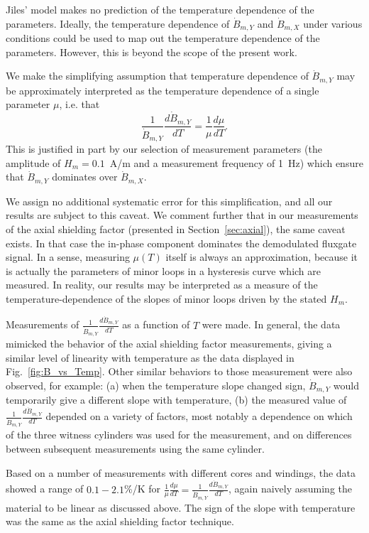 Jiles' model makes no prediction of the temperature dependence of the
parameters.  Ideally, the temperature dependence of $\dot{B}_{m,Y}$
and $\dot{B}_{m,X}$ under various conditions could be used to map out
the temperature dependence of the parameters.  However, this is beyond
the scope of the present work.

We make the simplifying assumption that temperature dependence of
$\dot{B}_{m,Y}$ may be approximately interpreted as the temperature
dependence of a single parameter $\mu$, i.e. that
\begin{equation}
\frac{1}{\dot{B}_{m,Y}}\frac{d\dot{B}_{m,Y}}{dT}=\frac{1}{\mu}\frac{d\mu}{dT}.
\end{equation}
This is justified in part by our selection of measurement parameters
(the amplitude of $H_m=0.1$~A/m and a measurement frequency of 1~Hz)
which ensure that $\dot{B}_{m,Y}$ dominates over $\dot{B}_{m,X}$.

We assign no additional systematic error for this simplification, and
all our results are subject to this caveat.  We comment further that
in our measurements of the axial shielding factor (presented in
Section~\ref{sec:axial}), the same caveat exists.  In that case the
in-phase component dominates the demodulated fluxgate signal.  In a
sense, measuring $\mu(T)$ itself is always an approximation, because
it is actually the parameters of minor loops in a hysteresis curve
which are measured.  In reality, our results may be interpreted as a
measure of the temperature-dependence of the slopes of minor loops
driven by the stated $H_m$.

Measurements of $\frac{1}{\dot{B}_{m,Y}}\frac{d\dot{B}_{m,Y}}{dT}$ as
a function of $T$ were made.  In general, the data mimicked the
behavior of the axial shielding factor measurements, giving a similar
level of linearity with temperature as the data displayed in
Fig.~\ref{fig:B_vs_Temp}.  Other similar behaviors to those
measurement were also observed, for example: (a) when the temperature
slope changed sign, $\dot{B}_{m,Y}$ would temporarily give a different
slope with temperature, (b) the measured value of
$\frac{1}{\dot{B}_{m,Y}}\frac{d\dot{B}_{m,Y}}{dT}$ depended on a
variety of factors, most notably a dependence on which of the three
witness cylinders was used for the measurement, and on differences
between subsequent measurements using the same cylinder.

Based on a number of measurements with different cores and windings,
the data showed a range of $0.1-2.1$\%/K for
$\frac{1}{\mu}\frac{d\mu}{dT}=\frac{1}{\dot{B}_{m,Y}}\frac{d\dot{B}_{m,Y}}{dT}$,
again naively assuming the material to be linear as discussed above.
The sign of the slope with temperature was the same as the axial
shielding factor technique.

